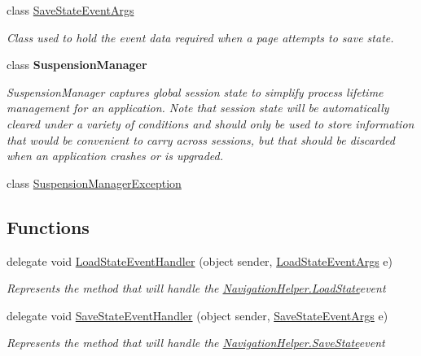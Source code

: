 \begin{DoxyCompactItemize}
class \hyperlink{class__1aarsproeve_1_1_common_1_1_save_state_event_args}{Save\+State\+Event\+Args}
\begin{DoxyCompactList}\small\item\em Class used to hold the event data required when a page attempts to save state. \end{DoxyCompactList}\item 
class {\bfseries Suspension\+Manager}
\begin{DoxyCompactList}\small\item\em Suspension\+Manager captures global session state to simplify process lifetime management for an application. Note that session state will be automatically cleared under a variety of conditions and should only be used to store information that would be convenient to carry across sessions, but that should be discarded when an application crashes or is upgraded. \end{DoxyCompactList}\item 
class \hyperlink{class__1aarsproeve_1_1_common_1_1_suspension_manager_exception}{Suspension\+Manager\+Exception}
\end{DoxyCompactItemize}
\subsection*{Functions}
\begin{DoxyCompactItemize}
\item 
delegate void \hyperlink{namespace__1aarsproeve_1_1_common_aee964a591f5ee233e54c70f38c9334cf}{Load\+State\+Event\+Handler} (object sender, \hyperlink{class__1aarsproeve_1_1_common_1_1_load_state_event_args}{Load\+State\+Event\+Args} e)
\begin{DoxyCompactList}\small\item\em Represents the method that will handle the \hyperlink{class__1aarsproeve_1_1_common_1_1_navigation_helper_ab4abff9d3eb04794d05d43ff3846e344}{Navigation\+Helper.\+Load\+State}event \end{DoxyCompactList}\item 
delegate void \hyperlink{namespace__1aarsproeve_1_1_common_acae0399935efb5f4aff5ba3cdfd92246}{Save\+State\+Event\+Handler} (object sender, \hyperlink{class__1aarsproeve_1_1_common_1_1_save_state_event_args}{Save\+State\+Event\+Args} e)
\begin{DoxyCompactList}\small\item\em Represents the method that will handle the \hyperlink{class__1aarsproeve_1_1_common_1_1_navigation_helper_a627a89278c28e536b6e7fea11da6d465}{Navigation\+Helper.\+Save\+State}event \end{DoxyCompactList}\end{DoxyCompactItemize}


